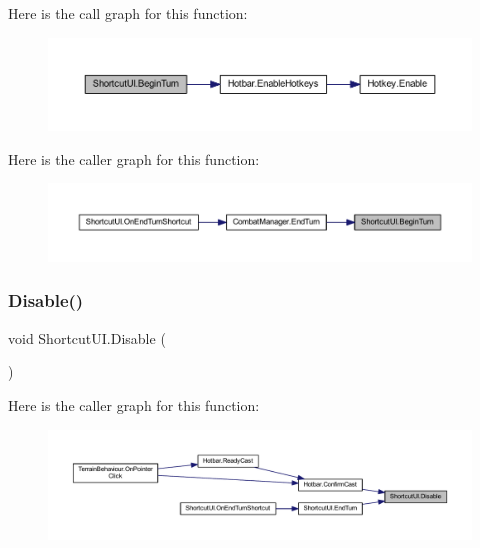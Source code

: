 Here is the call graph for this function\+:
\nopagebreak
\begin{figure}[H]
\begin{center}
\leavevmode
\includegraphics[width=350pt]{class_shortcut_u_i_af20cdb51997f4ae7219a36a7bca851a3_cgraph}
\end{center}
\end{figure}
Here is the caller graph for this function\+:
\nopagebreak
\begin{figure}[H]
\begin{center}
\leavevmode
\includegraphics[width=350pt]{class_shortcut_u_i_af20cdb51997f4ae7219a36a7bca851a3_icgraph}
\end{center}
\end{figure}
\mbox{\label{class_shortcut_u_i_a00f6fd2d64d2e5e978b749eafbe8f949}} 
\subsubsection{\texorpdfstring{Disable()}{Disable()}}
{\footnotesize\ttfamily void Shortcut\+U\+I.\+Disable (\begin{DoxyParamCaption}{ }\end{DoxyParamCaption})}

Here is the caller graph for this function\+:
\nopagebreak
\begin{figure}[H]
\begin{center}
\leavevmode
\includegraphics[width=350pt]{class_shortcut_u_i_a00f6fd2d64d2e5e978b749eafbe8f949_icgraph}
\end{center}
\end{figure}
\mbox{\label{class_shortcut_u_i_ae39ab7b830aff78693a4ddbaa3c59c3e}} 
